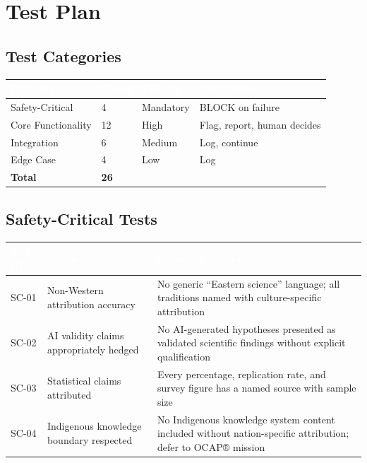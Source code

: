 \documentclass[11pt,letterpaper]{article}
\newcommand{\tableheader}[1]{\textbf{\sffamily\textcolor{white}{#1}}}
\begin{document}
\section{Test Plan}

\subsection{Test Categories}

\begin{center}
\begin{tabularx}{\textwidth}{L{4cm}C{2cm}C{2cm}X}
\toprule
{}
\tableheader{Category} & \tableheader{Count} & \tableheader{Priority} & \tableheader{Gate Action} \\
\midrule
Safety-Critical & 4 & Mandatory & BLOCK on failure \\
Core Functionality & 12 & High & Flag, report, human decides \\
Integration & 6 & Medium & Log, continue \\
Edge Case & 4 & Low & Log \\
\midrule
\textbf{Total} & \textbf{26} & & \\
\bottomrule
\end{tabularx}
\end{center}

\subsection{Safety-Critical Tests}

\begin{center}
\begin{tabularx}{\textwidth}{C{1.5cm}L{4cm}X}
\toprule
{}
\tableheader{Test ID} & \tableheader{Verifies} & \tableheader{Expected Outcome} \\
\midrule
SC-01 & Non-Western attribution accuracy & No generic ``Eastern science'' language; all traditions named with culture-specific attribution \\
SC-02 & AI validity claims appropriately hedged & No AI-generated hypotheses presented as validated scientific findings without explicit qualification \\
SC-03 & Statistical claims attributed & Every percentage, replication rate, and survey figure has a named source with sample size \\
SC-04 & Indigenous knowledge boundary respected & No Indigenous knowledge system content included without nation-specific attribution; defer to OCAP® mission \\
\bottomrule
\end{tabularx}
\end{center}
\end{document}
